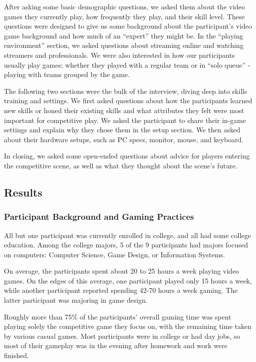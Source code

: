 \documentclass[11pt,manuscript,screen,review]{acmart} %
\begin{document}
After asking some basic demographic questions, we asked them about the video games they currently play, how frequently they play, and their skill level. These questions were designed to give us some background about the participant’s video game background and how much of an “expert” they might be. In the “playing environment” section, we asked questions about streaming online and watching streamers and professionals. We were also interested in how our participants usually play games; whether they played with a regular team or in “solo queue” - playing with teams grouped by the game.  

The following two sections were the bulk of the interview, diving deep into skills training and settings. We first asked questions about how the participants learned new skills or honed their existing skills and what attributes they felt were most important for competitive play. We asked the participant to share their in-game settings and explain why they chose them in the setup section. We then asked about their hardware setups, such as PC specs, monitor, mouse, and keyboard. 

In closing, we asked some open-ended questions about advice for players entering the competitive scene, as well as what they thought about the scene’s future. 

\subsection{Results}
\subsubsection{Participant Background and Gaming Practices}

All but one participant was currently enrolled in college, and all had some college education. Among the college majors, 5 of the 9 participants had majors focused on computers: Computer Science, Game Design, or Information Systems.

On average, the participants spent about 20 to 25 hours a week playing video games. On the edges of this average, one participant played only 15 hours a week, while another participant reported spending 42-70 hours a week gaming. The latter participant was majoring in game design. 

Roughly more than 75\% of the participants’ overall gaming time was spent playing solely the competitive game they focus on, with the remaining time taken by various casual games. Most participants were in college or had day jobs, so most of their gameplay was in the evening after homework and work were finished. 
\end{document}
